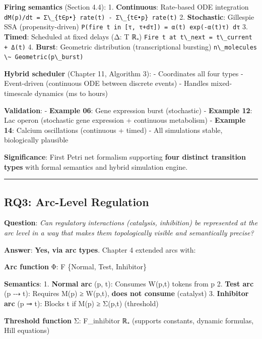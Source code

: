 \textbf{Firing semantics} (Section 4.4): 1. \textbf{Continuous}:
Rate-based ODE integration
\passthrough{\lstinline!dM(p)/dt = Σ\_\{t∈p•\} rate(t) - Σ\_\{t∈•p\} rate(t)!}
2. \textbf{Stochastic}: Gillespie SSA (propensity-driven)
\passthrough{\lstinline!P(fire t in [τ, τ+dτ]) = α(t) exp(-α(t)τ) dτ!}
3. \textbf{Timed}: Scheduled at fixed delays (Δ: T \textrightarrow ℝ₊)
\passthrough{\lstinline!Fire t at t\_next = t\_current + Δ(t)!} 4.
\textbf{Burst}: Geometric distribution (transcriptional bursting)
\passthrough{\lstinline!n\_molecules \~ Geometric(p\_burst)!}

\textbf{Hybrid scheduler} (Chapter 11, Algorithm 3): - Coordinates all
four types - Event-driven (continuous ODE between discrete events) -
Handles mixed-timescale dynamics (ms to hours)

\textbf{Validation}: - \textbf{Example 06}: Gene expression burst
(stochastic) - \textbf{Example 12}: Lac operon (stochastic gene
expression + continuous metabolism) - \textbf{Example 14}: Calcium
oscillations (continuous + timed) - All simulations stable, biologically
plausible

\textbf{Significance}: First Petri net formalism supporting \textbf{four
distinct transition types} with formal semantics and hybrid simulation
engine.

\begin{center}\rule{0.5\linewidth}{0.5pt}\end{center}

\hypertarget{rq3-arc-level-regulation}{%
\subsection{RQ3: Arc-Level Regulation}\label{rq3-arc-level-regulation}}

\textbf{Question}: \emph{Can regulatory interactions (catalysis,
inhibition) be represented at the arc level in a way that makes them
topologically visible and semantically precise?}

\textbf{Answer}: \textbf{Yes, via arc types}. Chapter 4 extended arcs
with:

\textbf{Arc function} Φ: F \textrightarrow \{Normal, Test, Inhibitor\}

\textbf{Semantics}: 1. \textbf{Normal arc} (p, t): Consumes W(p,t)
tokens from p 2. \textbf{Test arc} (p ⤏ t): Requires M(p) ≥ W(p,t),
\textbf{does not consume} (catalyst) 3. \textbf{Inhibitor arc} (p ⊸ t):
Blocks t if M(p) ≥ Σ(p,t) (threshold)

\textbf{Threshold function} Σ: F\_inhibitor \textrightarrow ℝ₊ (supports constants,
dynamic formulas, Hill equations)

